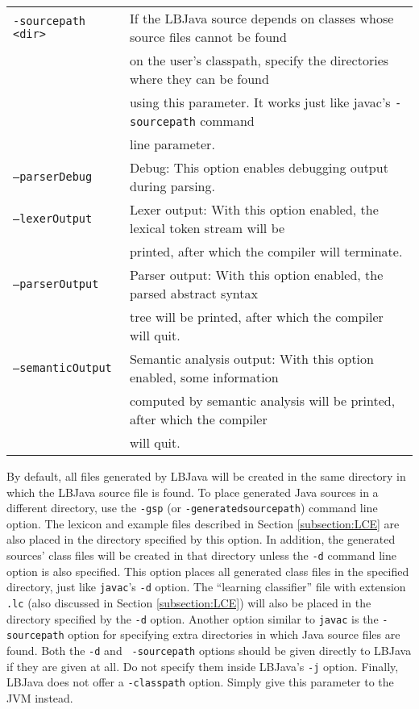 \begin{center}
\begin{tabular}{ll}
{\tt -sourcepath <dir>} &
If the LBJava source depends on classes whose source files cannot be found \\
& on the user's classpath, specify the directories where they can be found \\
& using this parameter. It works just like javac's {\tt -sourcepath} command
\\
& line parameter.  \vspace{.2cm} \\

{\tt --parserDebug} &
Debug: This option enables debugging output during parsing. \vspace{.2cm} \\

{\tt --lexerOutput} &
Lexer output: With this option enabled, the lexical token stream will be \\
& printed, after which the compiler will terminate. \vspace{.2cm} \\

{\tt --parserOutput} &
Parser output: With this option enabled, the parsed abstract syntax \\
& tree will be printed, after which the compiler will quit. \vspace{.2cm} \\

{\tt --semanticOutput} &
Semantic analysis output: With this option enabled, some information \\
& computed by semantic analysis will be printed, after which the compiler \\
& will quit.
\end{tabular}
\end{center}

\newpage
By default, all files generated by LBJava will be created in the same directory
in which the LBJava source file is found.  To place generated Java sources in a
different directory, use the {\tt -gsp} (or {\tt -generatedsourcepath})
command line option.  The lexicon and example files described in Section
\ref{subsection:LCE} are also placed in the directory specified by this
option.  In addition, the generated sources' class files will be created in
that directory unless the {\tt -d} command line option is also specified.
This option places all generated class files in the specified directory, just
like {\tt javac}'s {\tt -d} option.  The ``learning classifier'' file with
extension {\tt .lc} (also discussed in Section \ref{subsection:LCE}) will also
be placed in the directory specified by the {\tt -d} option.  Another option
similar to {\tt javac} is the {\tt -sourcepath} option for specifying extra
directories in which Java source files are found.  Both the {\tt -d} and {\tt
-sourcepath} options should be given directly to LBJava if they are given at all.
Do not specify them inside LBJava's {\tt -j} option.  Finally, LBJava does not offer
a {\tt -classpath} option.  Simply give this parameter to the JVM instead. \\

